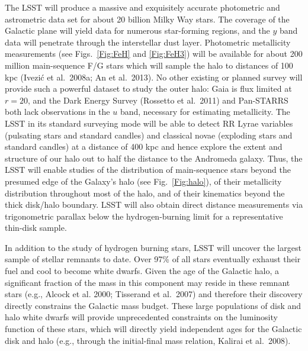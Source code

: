 The LSST will produce a massive and exquisitely accurate photometric and astrometric data set for about 20 billion 
Milky Way stars. The coverage of the Galactic plane will yield data for numerous star-forming 
regions, and the $y$ band data will penetrate through the interstellar dust layer. Photometric metallicity 
measurements (see Figs.~\ref{Fig:FeH} and \ref{Fig:FeH3}) will be available for about 200 million main-sequence 
F/G stars which will sample the halo to distances of 100 kpc (Ivezi\'{c} et al.~2008a; An et al.~2013). No other 
existing or planned survey will provide such a powerful dataset to
study the outer halo: Gaia
is flux limited at $r=20$, and the Dark Energy Survey (Rossetto et al.~2011) and Pan-STARRS both 
lack observations in the $u$ band, necessary for estimating metallicity. The LSST in its standard surveying mode will 
be able to detect RR Lyrae variables (pulsating stars and standard candles) and classical novae (exploding stars 
and standard candles) at a distance of 400 kpc and hence explore the extent and structure of our  halo out to 
half the distance to the Andromeda galaxy. Thus, the LSST will enable studies of the distribution of main-sequence 
stars beyond the presumed edge of the Galaxy's halo (see Fig.~\ref{Fig:halo}), of their metallicity distribution
throughout most of the halo, and of their kinematics beyond the thick disk/halo boundary. LSST will also obtain 
direct distance measurements via trigonometric parallax below the hydrogen-burning limit for a representative
thin-disk sample.


In addition to the study of hydrogen burning stars, LSST will uncover the largest sample of stellar remnants to date. 
Over 97\% of all stars eventually exhaust their fuel and cool to become white dwarfs. Given the age of the Galactic 
halo, a significant fraction of the mass in this component may reside in these remnant stars (e.g., Alcock et al.
2000; Tisserand et al.~2007) and therefore their discovery directly constrains the Galactic mass budget.  These large 
populations of disk and halo white dwarfs will provide unprecedented constraints on the luminosity function of
these stars, which will directly yield independent ages for the Galactic disk and halo (e.g., through the initial-final mass
relation, Kalirai et al.~2008).

